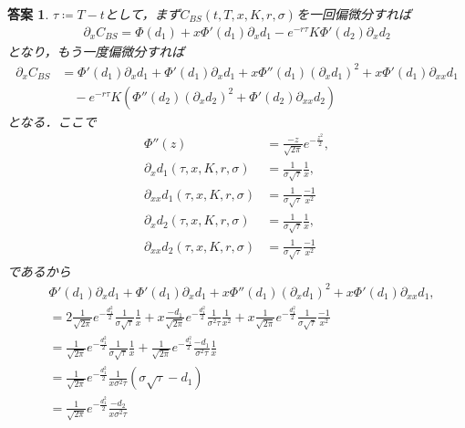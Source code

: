 \documentclass[11pt,a4paper]{jsarticle}
\theoremstyle{mystyle}
\newtheorem*{ans}{答案}
\begin{document}
\begin{ans}
	$\tau \coloneqq T - t$として，まず$C_{BS}(t,T,x,K,r,\sigma)$を一回偏微分すれば
	\begin{align}
		\partial_{x}C_{BS} = \Phi(d_{1}) + x \Phi'(d_{1}) \partial_{x}d_{1}
		- e^{-r\tau}K\Phi'(d_{2})\partial_{x}d_{2} 
	\end{align}
	となり，もう一度偏微分すれば
	\begin{align}
		\partial_{x}C_{BS} &= \Phi'(d_{1})\partial_{x}d_{1} 
		+ \Phi'(d_{1}) \partial_{x}d_{1} + x \Phi''(d_{1}) (\partial_{x} d_{1})^{2}
		+ x \Phi'(d_{1}) \partial_{xx} d_{1} \\
		&\quad - e^{-r\tau}K\left(\Phi''(d_{2})(\partial_{x}d_{2})^{2}
		+ \Phi'(d_{2})\partial_{xx}d_{2}\right)
		\label{formula:4_1}
	\end{align}
	となる．ここで
	\begin{align}
		\Phi''(z) &= \frac{-z}{\sqrt{2\pi}}e^{-\frac{z^{2}}{2}}, \\
		\partial_{x} d_{1}(\tau,x,K,r,\sigma) &= \frac{1}{\sigma\sqrt{\tau}} \frac{1}{x}, \\
		\partial_{xx} d_{1}(\tau,x,K,r,\sigma) &= \frac{1}{\sigma\sqrt{\tau}} \frac{-1}{x^{2}} \\
		\partial_{x} d_{2}(\tau,x,K,r,\sigma) &= \frac{1}{\sigma\sqrt{\tau}} \frac{1}{x}, \\
		\partial_{xx} d_{2}(\tau,x,K,r,\sigma) &= \frac{1}{\sigma\sqrt{\tau}} \frac{-1}{x^{2}}
	\end{align}
	であるから
	\begin{align}
		&\Phi'(d_{1})\partial_{x}d_{1} 
		+ \Phi'(d_{1}) \partial_{x}d_{1} + x \Phi''(d_{1}) (\partial_{x} d_{1})^{2}
		+ x \Phi'(d_{1}) \partial_{xx} d_{1}, \\
		&= 2\frac{1}{\sqrt{2\pi}}e^{-\frac{d_{1}^{2}}{2}} \frac{1}{\sigma\sqrt{\tau}}\frac{1}{x} 
		+ x\frac{-d_{1}}{\sqrt{2\pi}}e^{-\frac{d_{1}^{2}}{2}} 
		\frac{1}{\sigma^{2}\tau}\frac{1}{x^{2}}
		+ x\frac{1}{\sqrt{2\pi}}e^{-\frac{d_{1}^{2}}{2}} \frac{1}{\sigma\sqrt{\tau}}\frac{-1}{x^{2}} \\
		&= \frac{1}{\sqrt{2\pi}}e^{-\frac{d_{1}^{2}}{2}} \frac{1}{\sigma\sqrt{\tau}}\frac{1}{x} 
		+ \frac{1}{\sqrt{2\pi}}e^{-\frac{d_{1}^{2}}{2}} \frac{-d_{1}}{\sigma^{2}\tau} \frac{1}{x} \\
		&= \frac{1}{\sqrt{2\pi}}e^{-\frac{d_{1}^{2}}{2}} \frac{1}{x\sigma^{2}\tau}
		(\sigma \sqrt{\tau} - d_{1}) \\
		&= \frac{1}{\sqrt{2\pi}}e^{-\frac{d_{1}^{2}}{2}} \frac{-d_{2}}{x\sigma^{2}\tau}
	\end{align}

\end{ans}
\end{document}
